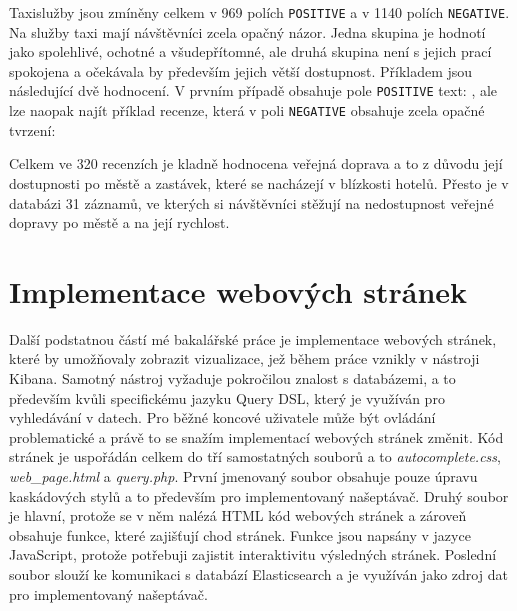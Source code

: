 \documentclass[czech,BP]{thesiskiv}
\begin{document}
Taxislužby jsou zmíněny celkem v 969 polích \texttt{POSITIVE} a v 1140 polích \texttt{NEGATIVE}. Na služby taxi mají návštěvníci zcela opačný názor. Jedna skupina je hodnotí jako spolehlivé, ochotné a všudepřítomné, ale druhá skupina není s jejich prací spokojena a očekávala by především jejich větší dostupnost. Příkladem jsou následující dvě hodnocení. V prvním případě obsahuje pole \texttt{POSITIVE} text: \textit{}, ale lze naopak najít příklad recenze, která v poli \texttt{NEGATIVE} obsahuje zcela opačné tvrzení: \textit{}


Celkem ve 320 recenzích je kladně hodnocena veřejná doprava a to z důvodu její dostupnosti po městě a zastávek, které se nacházejí v blízkosti hotelů. Přesto je v databázi 31 záznamů, ve kterých si návštěvníci stěžují na nedostupnost veřejné dopravy po městě a na její rychlost. 


 

\chapter{Implementace webových stránek}
\label{chap:WEB}
Další podstatnou částí mé bakalářské práce je implementace webových stránek, které by umožňovaly zobrazit vizualizace, jež během práce vznikly v nástroji Kibana. Samotný nástroj vyžaduje pokročilou znalost s databázemi, a to především kvůli specifickému jazyku Query DSL, který je využíván pro vyhledávání v datech. Pro běžné koncové uživatele může být ovládání problematické a právě to se snažím implementací webových stránek změnit. Kód stránek je uspořádán celkem do tří samostatných souborů a to \textit{autocomplete.css}, \textit{web\_page.html} a \textit{query.php}. První jmenovaný soubor obsahuje pouze úpravu kaskádových stylů a to především pro implementovaný našeptávač. Druhý soubor je hlavní, protože se v něm nalézá HTML kód webových stránek a zároveň obsahuje funkce, které zajišťují chod stránek. Funkce jsou napsány v jazyce JavaScript, protože potřebuji zajistit interaktivitu výsledných stránek. Poslední soubor slouží ke komunikaci s databází Elasticsearch a je využíván jako zdroj dat pro implementovaný našeptávač.
\end{document}
